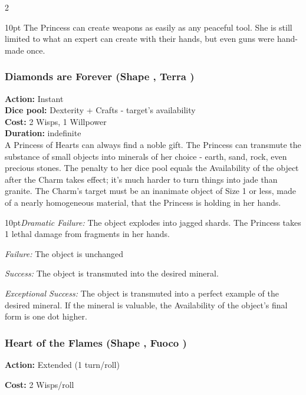 \begin{multicols}{2}
\begin{myindentpar}{10pt}
The Princess can create weapons as easily as any peaceful tool. She is still limited to what an expert can create with their hands, but even guns were hand-made once.\end{myindentpar}

\subsubsection*{Diamonds are Forever (Shape \textbullet\textbullet\textbullet, Terra \textbullet\textbullet\textbullet)}

\textbf{Action:} Instant\\
\textbf{Dice pool:} Dexterity + Crafts - target's availability\\
\textbf{Cost:} 2 Wisps, 1 Willpower\\
\textbf{Duration:} indefinite\\

\noindent A Princess of Hearts can always find a noble gift. The Princess can transmute the substance of small objects into minerals of her choice - earth, sand, rock, even precious stones. The penalty to her dice pool equals the Availability of the object after the Charm takes effect; it’s much harder to turn things into jade than granite. The Charm’s target must be an inanimate object of Size 1 or less, made of a nearly homogeneous material, that the Princess is holding in her hands.

\begin{myindentpar}{10pt}\emph{Dramatic Failure:} The object explodes into jagged shards. The Princess takes 1 lethal damage from fragments in her hands.

\emph{Failure:} The object is unchanged

\emph{Success:} The object is transmuted into the desired mineral.

\emph{Exceptional Success:} The object is transmuted into a perfect example of the desired mineral. If the mineral is valuable, the Availability of the object’s final form is one dot higher.\end{myindentpar}

\subsubsection*{Heart of the Flames (Shape \textbullet\textbullet\textbullet, Fuoco \textbullet\textbullet)}

\noindent \textbf{Action:} Extended (1 turn/roll)

\noindent \textbf{Cost:} 2 Wisps/roll


\end{multicols}
